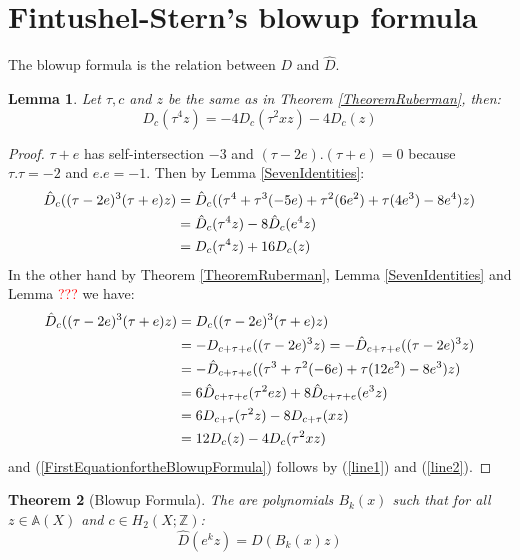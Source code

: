 \documentclass[a4paper]{article}
\newcommand{\Z}{\mathbb{Z}}
\newtheorem{theorem}{Theorem}
\newtheorem{lemma}[theorem]{Lemma}
\theoremstyle{definition}
\numberwithin{theorem}{subsection}
\begin{document}
\section{Fintushel-Stern's blowup formula}
The blowup formula is the relation between $D$ and $\hat{D}$.
\begin{lemma}\label{FirstLemmafortheBlowupFormula}
Let $\tau, c $ and $z$ be the same as in Theorem \ref{TheoremRuberman}, then:
\begin{equation}\label{FirstEquationfortheBlowupFormula}
    D_{c}(\tau^{4}z)=-4D_{c}(\tau^{2}xz)-4D_{c}(z)
\end{equation}
\end{lemma}
\begin{proof}
$\tau+e$ has self-intersection $-3$ and $(\tau-2e).(\tau+e)=0$ because $\tau.\tau =-2$ and $e.e=-1$. Then by Lemma \ref{SevenIdentities}:
\begin{align}
\hat{D}_{c}((\tau-2e)^3(\tau+e)z) &=\hat{D}_{c}((\tau^4+\tau^3(-5e)+\tau^2(6e^2)+\tau(4e^3)-8e^4)z)\notag\\
 &= \hat{D}_{c}(\tau^4z)-8\hat{D}_{c}(e^4z)\notag\\
 &= D_{c}(\tau^4z)+16D_{c}(z)\label{line1}
\end{align} 
In the other hand by Theorem \ref{TheoremRuberman}, Lemma \ref{SevenIdentities} and Lemma \textcolor{red}{???} we have:
\begin{align}
\hat{D}_{c}((\tau-2e)^3(\tau+e)z) &= D_{c}((\tau-2e)^3(\tau+e)z)\notag\\
&= -D_{c+\tau+e}((\tau-2e)^3z)=-\hat{D}_{c+\tau+e}((\tau-2e)^3z)\notag\\
&= -\hat{D}_{c+\tau+e}((\tau^3+\tau^2(-6e)+\tau(12e^2)-8e^3)z)\notag\\
&= 6\hat{D}_{c+\tau+e}(\tau^2ez)+8\hat{D}_{c+\tau+e}(e^3z)\notag\\
&= 6D_{c+\tau}(\tau^2z)-8D_{c+\tau}(xz)\notag\\
&= 12D_{c}(z)-4D_{c}(\tau^2xz)\label{line2}
\end{align}
and (\ref{FirstEquationfortheBlowupFormula}) follows by (\ref{line1}) and (\ref{line2}).
\end{proof}
\begin{theorem}[Blowup Formula]
The are polynomials $B_{k}(x)$ such that for all $z\in \mathbb{A}(X)$ and $c\in H_{2}(X;\Z)$:
\begin{equation}\label{line3}
    \hat{D}(e^{k}z)=D(B_{k}(x)z)
\end{equation}   
\end{theorem}
\end{document}
